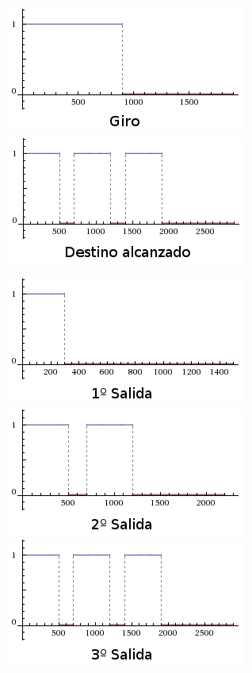 \begin{slide}
  \begin{figure}[!h]
    \begin{center}
      \includegraphics[height=0.3\textheight]{img/graficaGiro.png}
      \includegraphics[height=0.3\textheight]{img/graficaDestino.png}
    \end{center}
  \end{figure}
  \begin{figure}[!h]
    \begin{center}
      \includegraphics[height=0.25\textheight]{img/graficaRotonda1.png}
      \includegraphics[height=0.25\textheight]{img/graficaRotonda2.png}
      \includegraphics[height=0.25\textheight]{img/graficaRotonda3.png}
    \end{center}
  \end{figure}
\end{slide}

